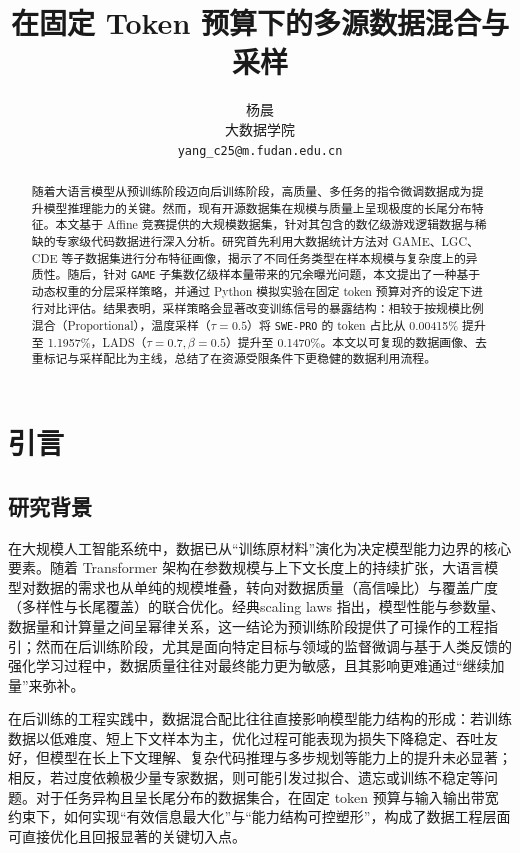 \documentclass[UTF8]{article}
\title{在固定 Token 预算下的多源数据混合与采样}
\author{
    {\hspace{1mm}杨晨} \\
    大数据学院\\
    \texttt{yang\_c25@m.fudan.edu.cn} \\
}
\begin{document}
\maketitle


\begin{abstract}
随着大语言模型从预训练阶段迈向后训练阶段，高质量、多任务的指令微调数据成为提升模型推理能力的关键。然而，现有开源数据集在规模与质量上呈现极度的长尾分布特征。本文基于 Affine 竞赛提供的大规模数据集，针对其包含的数亿级游戏逻辑数据与稀缺的专家级代码数据进行深入分析。研究首先利用大数据统计方法对 GAME、LGC、CDE 等子数据集进行分布特征画像，揭示了不同任务类型在样本规模与复杂度上的异质性。随后，针对 \texttt{GAME} 子集数亿级样本量带来的冗余曝光问题，本文提出了一种基于动态权重的分层采样策略，并通过 Python 模拟实验在固定 token 预算对齐的设定下进行对比评估。结果表明，采样策略会显著改变训练信号的暴露结构：相较于按规模比例混合（Proportional），温度采样（$\tau=0.5$）将 \texttt{SWE-PRO} 的 token 占比从 0.00415\% 提升至 1.1957\%，LADS（$\tau=0.7,\beta=0.5$）提升至 0.1470\%。本文以可复现的数据画像、去重标记与采样配比为主线，总结了在资源受限条件下更稳健的数据利用流程。

\end{abstract}

\section{引言}\label{sec:introduction}

\subsection{研究背景}
在大规模人工智能系统中，数据已从“训练原材料”演化为决定模型能力边界的核心要素。随着 Transformer 架构在参数规模与上下文长度上的持续扩张，大语言模型对数据的需求也从单纯的规模堆叠，转向对数据质量（高信噪比）与覆盖广度（多样性与长尾覆盖）的联合优化。经典scaling laws 指出，模型性能与参数量、数据量和计算量之间呈幂律关系，这一结论为预训练阶段提供了可操作的工程指引；然而在后训练阶段，尤其是面向特定目标与领域的监督微调与基于人类反馈的强化学习过程中，数据质量往往对最终能力更为敏感，且其影响更难通过“继续加量”来弥补。\citep{kaplan2020scaling,hoffmann2022training}

在后训练的工程实践中，数据混合配比往往直接影响模型能力结构的形成：若训练数据以低难度、短上下文样本为主，优化过程可能表现为损失下降稳定、吞吐友好，但模型在长上下文理解、复杂代码推理与多步规划等能力上的提升未必显著；相反，若过度依赖极少量专家数据，则可能引发过拟合、遗忘或训练不稳定等问题。对于任务异构且呈长尾分布的数据集合，在固定 token 预算与输入输出带宽约束下，如何实现“有效信息最大化”与“能力结构可控塑形”，构成了数据工程层面可直接优化且回报显著的关键切入点。
\end{document}
